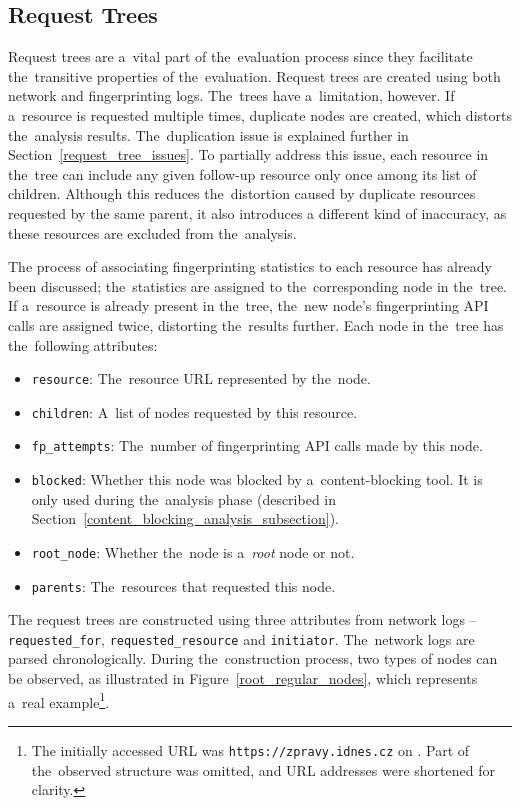 \subsection{Request Trees}
\label{req-tree-sub1}
Request trees are a~vital part of the~evaluation process since they facilitate the~transitive properties of the~evaluation. Request trees are created using both network and fingerprinting logs. The~trees have a~limitation, however. If a~resource is requested multiple times, duplicate nodes are created, which distorts the~analysis results. The~duplication issue is explained further in Section~\ref{request_tree_issues}. To partially address this issue, each resource in the~tree can include any given follow-up resource only once among its list of children. Although this reduces the~distortion caused by duplicate resources requested by the same parent, it also introduces a different kind of inaccuracy, as these resources are excluded from the~analysis.

The process of associating fingerprinting statistics to each resource has already been discussed; the~statistics are assigned to the~corresponding node in the~tree. If a~resource is already present in the~tree, the~new node's fingerprinting API calls are assigned twice, distorting the~results further. Each node in the~tree has the~following attributes:

\begin{itemize}
\setlength\itemsep{0em}
    \item \texttt{resource}: The~resource URL represented by the~node.
    \item \texttt{children}: A~list of nodes requested by this resource.
    \item \texttt{fp\_attempts}: The~number of fingerprinting API calls made by this node.
    \item \texttt{blocked}: Whether this node was blocked by a~content-blocking tool. It is only used during the~analysis phase (described in Section~\ref{content_blocking_analysis_subsection}).
    \item \texttt{root\_node}: Whether the~node is a~\textit{root} node or not.
    \item \texttt{parents}: The~resources that requested this node.
\end{itemize}

The request trees are constructed using three attributes from network logs -- \texttt{requested\_{\linebreak}for}, \texttt{requested\_resource} and \texttt{initiator}. The~network logs are parsed chronologically. During the~construction process, two types of nodes can be observed, as illustrated in Figure~\ref{root_regular_nodes}, which represents a~real example\footnote{The initially accessed URL was \texttt{https://zpravy.idnes.cz} on . Part of the~observed structure was omitted, and URL addresses were shortened for clarity.}.

